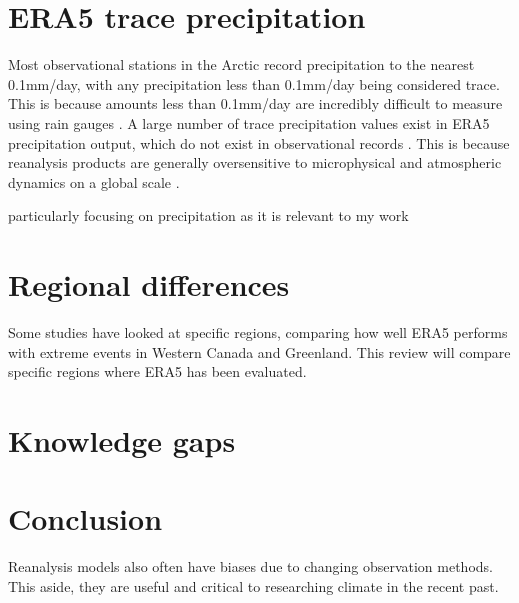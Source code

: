 \documentclass[11pt, oneside]{article}
\begin{document}
\section{ERA5 trace precipitation}\label{traceprecip}
Most observational stations in the Arctic record precipitation to the nearest 0.1mm/day, with any precipitation less than 0.1mm/day being considered trace. This is because amounts less than 0.1mm/day are incredibly difficult to measure using rain gauges \cite[p.~3-50]{meteorological2015manobs}. A large number of trace precipitation values exist in ERA5 precipitation output, which do not exist in observational records \cite{shen2022performance}. This is because reanalysis products are generally oversensitive to microphysical and atmospheric dynamics on a global scale \cite{boisvert2018intercomparison}. 


particularly focusing on precipitation as it is relevant to my work
\section{Regional differences}
Some studies have looked at specific regions, comparing how well ERA5 performs with extreme events \cite{loeb2022extreme} in Western Canada and Greenland. This review will compare specific regions where ERA5 has been evaluated.


\section{Knowledge gaps}


\section{Conclusion}

Reanalysis models also often have biases due to changing observation methods. This aside, they are useful and critical to researching climate in the recent past. 




 {}

\end{document}
